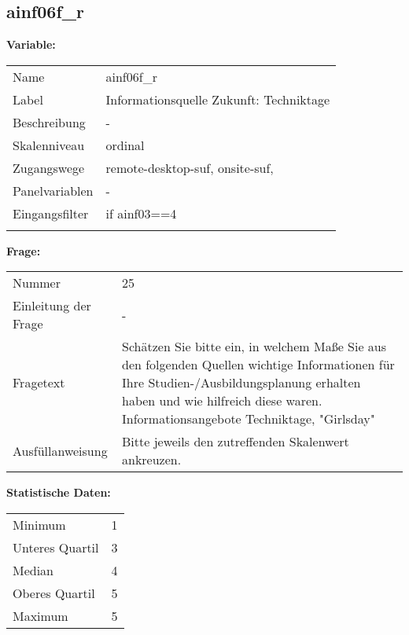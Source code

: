 	
	
	\subsection{ainf06f\_r}
	\label{subSection:ainf06f_r}

	\noindent\textbf{Variable:}\\
		\begin{tabular}{lL{11.3cm}}
			\label{tableVariable:ainf06f_r}
			Name & ainf06f\_r \\
			Label & Informationsquelle Zukunft: Techniktage \\
			Beschreibung & - \\
			Skalenniveau & ordinal \\
			Zugangswege &
				remote-desktop-suf,
				onsite-suf,
 \\
			Panelvariablen & -
			 \\
			Eingangsfilter & if ainf03==4 \\
 \\
		\end{tabular}

		\vspace*{1 cm}
		\noindent\textbf{Frage:}\\
		\begin{tabular}{lL{11.3cm}}
			\label{tableQuestion:ainf06f_r}
			Nummer & 25 \\
			Einleitung der Frage & - \\
			Fragetext & Schätzen Sie bitte ein, in welchem Maße Sie aus den folgenden Quellen wichtige Informationen für Ihre Studien-/Ausbildungsplanung erhalten haben und wie hilfreich diese waren.
Informationsangebote
Techniktage, "Girlsday" \\
			Ausfüllanweisung & Bitte jeweils den zutreffenden Skalenwert ankreuzen. \\
		\end{tabular}


		\vspace*{1 cm}
		\noindent\textbf{Statistische Daten:}\\
			\begin{tabular}{ll}
				\label{tableStatistics:ainf06f_r}
					Minimum & 1 \\
					Unteres Quartil & 3 \\
					Median & 4 \\
					Oberes Quartil & 5 \\
					Maximum & 5 \\
			\end{tabular}



